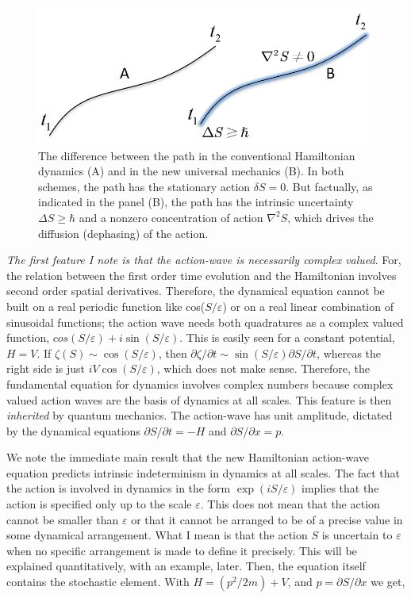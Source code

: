 \begin{figure}[H]
\centering
\includegraphics[scale=0.65]{src/images/chap27/2.jpg}
\caption{The difference between the path in the conventional Hamiltonian dynamics (A) and in
the new universal mechanics (B). In both schemes, the path has the stationary action $\delta S = 0$.
But factually, as indicated in the panel (B), the path has the intrinsic uncertainty $\Delta S \geq \hbar$ and a
nonzero concentration of action $\nabla^2 S$, which drives the diffusion (dephasing) of the action.}\label{ch14-fig2}
\end{figure}

\textit{The first feature I note is that the action-wave is necessarily complex valued}. For, the relation between the first order time evolution and the Hamiltonian involves second order spatial
derivatives. Therefore, the dynamical equation cannot be built on a real periodic function
like cos($S/\varepsilon$) or on a real linear combination of sinusoidal functions; the action wave needs
both quadratures as a complex valued function, $cos(S/\varepsilon) + i \sin(S/\varepsilon)$. This is easily seen for
a constant potential, $H = V$. If $\zeta(S) \sim \cos (S/\varepsilon)$, then $\partial \zeta/\partial t \sim \sin (S/\varepsilon) \partial S/\partial t$, whereas
the right side is just $iV \cos (S/\varepsilon)$, which does not make sense. Therefore, the fundamental
equation for dynamics involves complex numbers because complex valued action waves are
the basis of dynamics at all scales. This feature is then \textit{inherited} by quantum mechanics.
The action-wave has unit amplitude, dictated by the dynamical equations $\partial S/\partial t = -H$ and
$\partial S/\partial x = p$.

We note the immediate main result that the new Hamiltonian action-wave equation
predicts intrinsic indeterminism in dynamics at all scales. The fact that the action is
involved in dynamics in the form $\exp(iS/\varepsilon)$ implies that the action is specified only up to
the scale $\varepsilon$. This does not mean that the action cannot be smaller than $\varepsilon$ or that it cannot be
arranged to be of a precise value in some dynamical arrangement. What I mean is that the
action $S$ is uncertain to $\varepsilon$ when no specific arrangement is made to define it precisely. This
will be explained quantitatively, with an example, later. Then, the equation itself contains
the stochastic element. With $H = (p^2 /2m) + V$, and $p = \partial S/\partial x$ we get,

